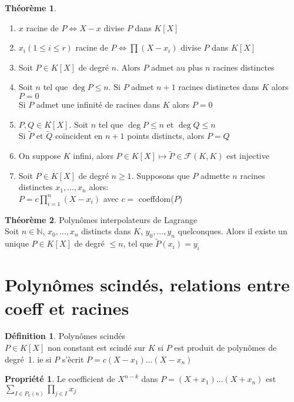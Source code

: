 \documentclass[fleqn]{article}
\theoremstyle{definition} \newtheorem*{defi}{D\'efinition}
\theoremstyle{definition} \newtheorem*{theo}{Th\'eor\`eme}
\theoremstyle{definition} \newtheorem*{coro}{Corollaire}
\theoremstyle{definition} \newtheorem*{nota}{Notation}
\theoremstyle{remark} \newtheorem*{rqs}{Remarques}
\theoremstyle{definition} \newtheorem*{prop}{Propri\'et\'e}
\begin{document}
\begin{theo} $ $
	\begin{enumerate}
		\item $x$ racine de $P \Leftrightarrow X - x$ divise $P$ dans $K[X]$
		\item $x_i (1 \leq i \leq r)$ racine de $P \Leftrightarrow \prod (X - x_i)$ divise $P$ dans $K[X]$
		\item Soit $P \in K[X]$ de degr\'e $n$. Alors $P$ admet au plus $n$ racines distinctes
		\item Soit $n$ tel que $\deg P \leq n$. Si $P$ admet $n+1$ racines distinctes dans $K$ alors $P = 0$ \\
			Si $P$ admet une infinit\'e de racines dans $K$ alors $P = 0$
		\item $P,Q \in K[X]$. Soit $n$ tel que $\deg P \leq n$ et $\deg Q \leq n$ \\
			Si $\tilde{P}$ et $\tilde{Q}$ co\"incident en $n+1$ points distincts, alors $P=Q$
		\item On suppose $K$ infini, alors $P \in K[X] \mapsto \tilde{P} \in \mathcal{F}(K,K)$ est injective
		\item Soit $P \in K[X]$ de degr\'e $n \geq 1$. Supposons que $P$ admette $n$ racines distinctes $x_1, \hdots, x_n$ alors: \\
			$P = c\prod_{i=1}^n(X-x_i)$ avec $c = $ coeffdom($P$)
	\end{enumerate}
\end{theo}

\begin{theo} Polyn\^omes interpolateurs de Lagrange \\
	Soit $n\in \mathbb{N}$, $x_0, \hdots, x_n$ distincts dans $K$, $y_0, \hdots, y_n$ quelconques. Alors il existe un unique $P \in K[X]$
	de degr\'e $\leq n$, tel que $\tilde{P}(x_i) = y_i$
\end{theo}

\section{Polyn\^omes scind\'es, relations entre coeff et racines}
\begin{defi} Polyn\^omes scind\'es \\
	$P \in K[X]$ non constant est scind\'e sur $K$ si $P$ est produit de polyn\^omes de \mbox{degr\'e 1.}
	ie si $P$ s'\`ecrit $P = c(X-x_1)\hdots(X-x_n)$
\end{defi}

\begin{prop}
	Le coefficient de $X^{n-k}$ dans $P = (X+x_1) \hdots (X + x_n)$ est $\sum_{I \in P_k(n)} \prod_{j \in I} x_j$
\end{prop}
\end{document}
